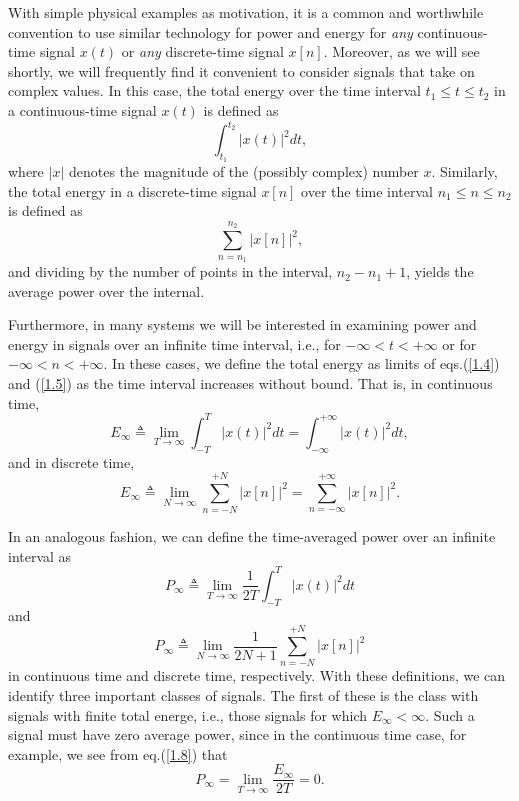 \documentclass[a4paper,10pt,twoside]{book}
\begin{document}
With simple physical examples as motivation, it is a common and worthwhile convention to use similar technology for power and energy for \textit{any} continuous-time signal $x(t)$ or \textit{any} discrete-time signal $x[n]$. Moreover, as we will see shortly, we will frequently find it convenient to consider signals that take on complex values. In this case, the total energy over the time interval $t_1\le t\le t_2$ in a continuous-time signal $x(t)$ is defined as
\begin{equation}
    \int_{t_{1}}^{t_{2}}|x(t)|^{2}dt,
    \label{1.4}
\end{equation}
where $|x|$ denotes the magnitude of the (possibly complex) number $x$. Similarly, the total energy in a discrete-time signal $x[n]$ over the time interval $n_1\le n\le n_2$ is defined as
\begin{equation}
    \sum_{n=n_{1}}^{n_{2}}|x[n]|^{2},
    \label{1.5}
\end{equation}
and dividing by the number of points in the interval, $n_2-n_1+1$, yields the average power over the internal.

Furthermore, in many systems we will be interested in examining power and energy in signals over an infinite time interval, i.e., for $-\infty<t<+\infty$ or for $-\infty<n<+\infty$. In these cases, we define the total energy as limits of eqs.\;(\ref{1.4}) and (\ref{1.5}) as the time interval increases without bound. That is, in continuous time,
\begin{equation}
    E_{\infty}\triangleq\lim_{T\to\infty}\int_{-T}^{T}|x(t)|^{2}dt = \int_{-\infty}^{+\infty}|x(t)|^{2}dt,
    \label{1.6}
\end{equation}
and in discrete time,
\begin{equation}
    E_{\infty}\triangleq\lim_{N\to\infty}\sum_{n=-N}^{+N}|x[n]|^{2} = \sum_{n=-\infty}^{+\infty}|x[n]|^{2}.
    \label{1.7}
\end{equation}

In an analogous fashion, we can define the time-averaged power over an infinite interval as
\begin{equation}
    P_{\infty}\triangleq\lim_{T\to\infty}\frac{1}{2T}\int_{-T}^{T}|x(t)|^{2} dt
    \label{1.8}
\end{equation}
and
\begin{equation}
    P_{\infty}\triangleq\lim_{N\to\infty}\frac{1}{2N+1}\sum_{n=-N}^{+N}|x[n]|^{2}
    \label{1.9}
\end{equation}
in continuous time and discrete time, respectively. With these definitions, we can identify three important classes of signals. The first of these is the class with signals with finite total energe, i.e., those signals for which $E_{\infty}<\infty$. Such a signal must have zero average power, since in the continuous time case, for example, we see from eq.\;(\ref{1.8}) that
\begin{equation}
    P_{\infty}=\lim_{T\to\infty}\frac{E_{\infty}}{2T} = 0.
    \label{1.10}
\end{equation}
\end{document}
